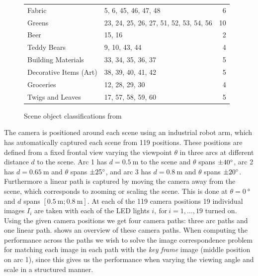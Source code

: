 \documentclass[thesis.tex]{subfiles}
\begin{document}
\begin{figure}[p]
\begin{tabular}{l l r}
		Fabric					& 5, 6, 45, 46, 47, 48						& 6 \\
		Greens					& 23, 24, 25, 26, 27, 51, 52, 53, 54, 56	& 10 \\
		Beer  					& 15, 16									& 2 \\
		Teddy Bears 			& 9, 10, 43, 44								& 4 \\
		Building Materials 		& 33, 34, 35, 36, 37						& 5 \\
		Decorative Items (Art) 	& 38, 39, 40, 41, 42						& 5 \\
		Groceries 				& 12, 28, 29, 30							& 4 \\
		Twigs and Leaves 		& 17, 57, 58, 59, 60 						& 5 \\
		\bottomrule
	\end{tabular}
	\caption{Scene object classifications from \cite[Table 1]{aanaes2010ground}}
	\label{tbl:dtu_scene_classifications}
\end{figure}

The camera is positioned around each scene using an industrial robot arm, which has automatically captured each scene from 119 positions. These positions are defined from a fixed frontal view varying the viewpoint $\theta$ in three arcs at different distance $d$ to the scene. Arc 1 has $d = \SI{0.5}{\meter}$ to the scene and $\theta$ spans $\SI{\pm40}{\degree}$, arc 2 has $d = \SI{0.65}{\meter}$ and $\theta$ spans $\SI{\pm25}{\degree}$, and arc 3 has $d = \SI{0.8}{\meter}$ and $\theta$ spans $\SI{\pm20}{\degree}$. Furthermore a linear path is captured by moving the camera away from the scene, which corresponds to zooming or scaling the scene. This is done at $\theta = \SI{0}{\degree}$ and $d$ spans $[\SI{0.5}{\meter};\SI{0.8}{\meter} ]$. At each of the 119 camera positions 19 individual images $I_i$ are taken with each of the LED lights $i,~\text{for}~i = 1,\hdots,19$ turned on. Using the given camera positions we get four camera paths: three arc paths and one linear path.  shows an overview of these camera paths. When computing the performance across the paths we wish to solve the image correspondence problem for matching each image in each path with the \emph{key frame} image (middle position on arc 1), since this gives us the performance when varying the viewing angle and scale in a structured manner.
\end{document}
